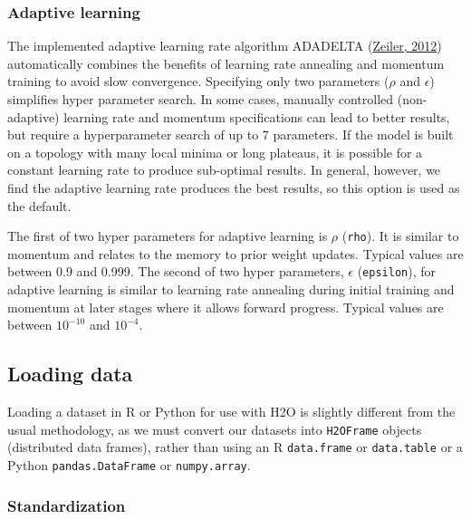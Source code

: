 \subsubsection{Adaptive learning} 
\label{sssec:AdaptiveLearning}
The implemented adaptive learning rate algorithm ADADELTA (\href{http://arxiv.org/pdf/1212.5701v1.pdf}{Zeiler, 2012})  automatically combines the benefits of learning rate annealing and momentum training to avoid slow convergence. Specifying only two parameters ($\rho$ and $\epsilon$)  simplifies hyper parameter search. In some cases, manually controlled (non-adaptive) learning rate and momentum specifications can lead to better results, but require a hyperparameter search of up to 7 parameters. If the model is built on a topology with many local minima or long plateaus, it is possible for a constant learning rate to produce sub-optimal results. In general, however, we find the adaptive learning rate produces the best results, so this option is used as the default. 

The first of two hyper parameters for adaptive learning is $\rho$ (\texttt{rho}). It is similar to momentum and relates to the memory to prior weight updates. Typical values are between 0.9 and 0.999. The second of two hyper parameters, $\epsilon$ (\texttt{epsilon}), for adaptive learning is similar to learning rate annealing during initial training and momentum at later stages where it allows forward progress.
Typical values are between $10^{-10}$ and $10^{-4}$.

\subsection{Loading data} 

Loading a dataset in R or Python for use with H2O is slightly different from the usual methodology, as we must convert
our datasets into \texttt{H2OFrame} objects (distributed data frames), rather than using an R \texttt{data.frame} or \texttt{data.table} or a Python \texttt{pandas.DataFrame} or \texttt{numpy.array}. 

\subsubsection{Standardization} 

